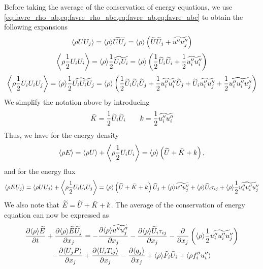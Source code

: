 \documentclass[oneside,a4paper,11pt]{report}
\begin{document}
Before taking the average of the conservation of energy equations, we use \cref{eq:favre_rho_ab,eq:favre_rho_abc,eq:favre_ab,eq:favre_abc} to obtain the following expansions
\begin{equation}
\label{eq:intener_flux_exansion}
    \left < \rho U U_j \right > = \langle \rho \rangle \widetilde{UU_j} = \langle \rho \rangle \left ( \widetilde{U} \widetilde{U}_j + \widetilde{u'' u_j''} \right)
\end{equation}
\begin{equation}
\label{eq:tke_expansion}
    \left < \rho \frac{1}{2} U_i U_i \right > = \langle \rho \rangle \frac{1}{2} \widetilde{U_i U_i} = \langle \rho \rangle \left ( \frac{1}{2} \widetilde{U}_i \widetilde{U}_i +  \frac{1}{2} \widetilde{u_i'' u_i''} \right)
\end{equation}
\begin{equation}
\label{eq:tke_flux_expansion}
    \left < \rho \frac{1}{2} U_i U_i U_j \right > = \langle \rho \rangle \frac{1}{2} \widetilde{U_i U_i U_j} = \langle \rho \rangle \left ( \frac{1}{2} \widetilde{U}_i \widetilde{U}_i \widetilde{U}_j + \frac{1}{2} \widetilde{u_i'' u_i''} \widetilde{U}_j + \widetilde{U}_i \widetilde{u_i'' u_j''} +  \frac{1}{2} \widetilde{u_i'' u_i'' u_j''} \right)
\end{equation}
We simplify the notation above by introducing
\begin{equation}
    \bar{K} = \frac{1}{2} \widetilde{U}_i \widetilde{U}_i \qquad k = \frac{1}{2} \widetilde{u_i'' u_i''}
\end{equation}
Thus, we have for the energy density
\begin{equation}
    \left < \rho E \right > = \left < \rho U \right > + \left < \rho \frac{1}{2} U_i U_i \right > = \langle \rho \rangle \left ( \widetilde{U} +  \bar{K} + k \right ),
\end{equation}
and for the energy flux
\begin{equation}
    \left < \rho E U_j \right > = \left < \rho U U_j \right > + \left < \rho \frac{1}{2} U_i U_i U_j \right > = \langle \rho \rangle \left(\widetilde{U} + \bar{K} + k \right) \widetilde{U}_j + \langle \rho \rangle \widetilde{u'' u_j''} + \langle \rho \rangle \widetilde{U}_i \tau_{ij} + \langle \rho \rangle \frac{1}{2} \widetilde{u_i'' u_i'' u_j''}
\end{equation}
We also note that $\widetilde{E} = \widetilde{U} + \bar{K} + k$. The average of the conservation of energy equation can now be expressed as
\begin{multline}
\label{eq:favre_energy_intermediate}
\frac{\partial \langle \rho \rangle \widetilde{E}}{\partial t} + \frac{\partial \langle \rho \rangle \widetilde{E} \widetilde{U}_j }{\partial x_j} = -\frac{\partial \langle \rho \rangle \widetilde{ u'' u''_j } }{\partial x_j} - \frac{\partial \langle \rho \rangle \widetilde{U}_i \tau_{ij} }{\partial x_j} - \frac{ \partial }{ \partial x_j } \left ( \langle \rho \rangle \frac{1}{2} \widetilde{ u_i'' u_i'' u_j'' } \right ) \\
- \frac{ \partial \langle U_j P \rangle }{\partial x_j} + \frac{ \partial \langle U_i T_{ij} \rangle }{\partial x_j} - \frac{\partial \langle q_j \rangle}{\partial x_j} + \langle \rho \rangle \tilde{F}_i \tilde{U}_i + \langle \rho f_i'' u_i'' \rangle
\end{multline}
\end{document}
